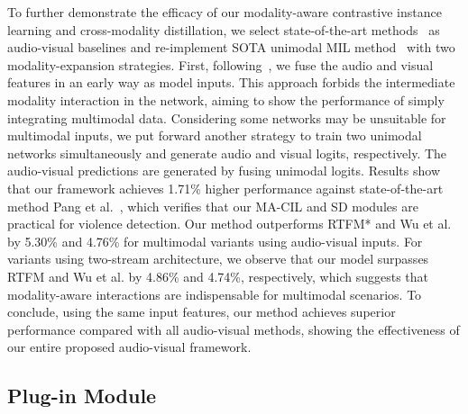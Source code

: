 \documentclass[sigconf]{acmart}
\begin{document}
To further demonstrate the efficacy of our modality-aware contrastive instance learning and cross-modality distillation, we select state-of-the-art methods~\cite{wu2020not, pang2021violence} as audio-visual baselines and re-implement SOTA unimodal MIL method~\cite{tian2021weakly} with two modality-expansion strategies. First, following~\cite{wu2020not}, we fuse the audio and visual features in an early way as model inputs. This approach forbids the intermediate modality interaction in the network, aiming to show the performance of simply integrating multimodal data. Considering some networks may be unsuitable for multimodal inputs, we put forward another strategy to train two unimodal networks simultaneously and generate audio and visual logits, respectively. The audio-visual predictions are generated by fusing unimodal logits. Results show that our framework achieves 1.71\% higher performance against state-of-the-art method Pang et al.~\cite{pang2021violence}, which verifies that our MA-CIL and SD modules are practical for violence detection. Our method outperforms RTFM* and Wu et al. by 5.30\% and 4.76\% for multimodal variants using audio-visual inputs. For variants using two-stream architecture, we observe that our model surpasses RTFM and Wu et al. by 4.86\% and 4.74\%, respectively, which suggests that modality-aware interactions are indispensable for multimodal scenarios. To conclude, using the same input features, our method achieves superior performance compared with all audio-visual methods, showing the effectiveness of our entire proposed audio-visual framework.

\subsection{Plug-in Module}
\end{document}
